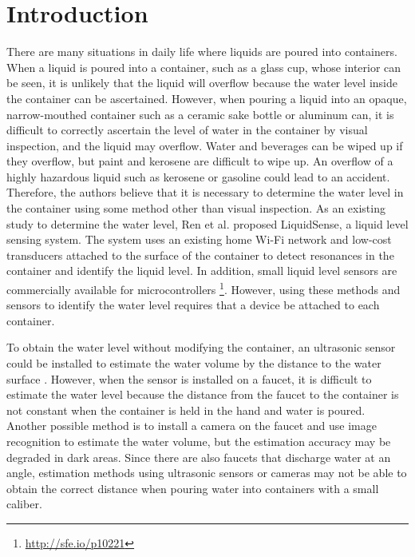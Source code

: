 \documentclass[sigconf]{acmart}
\begin{document}
\section{Introduction}
There are many situations in daily life where liquids are poured into containers. When a liquid is poured into a container, such as a glass cup, whose interior can be seen, it is unlikely that the liquid will overflow because the water level inside the container can be ascertained. However, when pouring a liquid into an opaque, narrow-mouthed container such as a ceramic sake bottle or aluminum can, it is difficult to correctly ascertain the level of water in the container by visual inspection, and the liquid may overflow. Water and beverages can be wiped up if they overflow, but paint and kerosene are difficult to wipe up. An overflow of a highly hazardous liquid such as kerosene or gasoline could lead to an accident. Therefore, the authors believe that it is necessary to determine the water level in the container using some method other than visual inspection. As an existing study to determine the water level, Ren et al. \cite{LiquidSense} proposed LiquidSense, a liquid level sensing system. The system uses an existing home Wi-Fi network and low-cost transducers attached to the surface of the container to detect resonances in the container and identify the liquid level. In addition, small liquid level sensors are commercially available for microcontrollers \footnote{\url{http://sfe.io/p10221}}. However, using these methods and sensors to identify the water level requires that a device be attached to each container.\par

To obtain the water level without modifying the container, an ultrasonic sensor could be installed to estimate the water volume by the distance to the water surface \cite{smart_faucet1}. However, when the sensor is installed on a faucet, it is difficult to estimate the water level because the distance from the faucet to the container is not constant when the container is held in the hand and water is poured. Another possible method is to install a camera on the faucet and use image recognition to estimate the water volume, but the estimation accuracy may be degraded in dark areas. Since there are also faucets that discharge water at an angle, estimation methods using ultrasonic sensors or cameras may not be able to obtain the correct distance when pouring water into containers with a small caliber.\par
\end{document}
